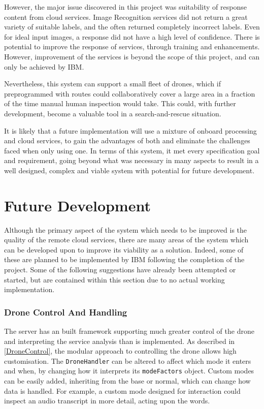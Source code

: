 \documentclass{article}
\begin{document}
However, the major issue discovered in this project was suitability of response content from cloud services. Image Recognition services did not return a great variety of suitable labels, and the often returned completely incorrect labels. Even for ideal input images, a response did not have a high level of confidence. There is potential to improve the response of services, through training and enhancements. However, improvement of the services is beyond the scope of this project, and can only be achieved by IBM. 

Nevertheless, this system can support a small fleet of drones, which if preprogrammed with routes could collaboratively cover a large area in a fraction of the time manual human inspection would take. This could, with further development, become a valuable tool in a search-and-rescue situation. 

It is likely that a future implementation will use a mixture of onboard processing and cloud services, to gain the advantages of both and eliminate the challenges faced when only using one. In terms of this system, it met every specification goal and requirement, going beyond what was necessary in many aspects to result in a well designed, complex and viable system with potential for future development.

\section{Future Development}
Although the primary aspect of the system which needs to be improved is the quality of the remote cloud services, there are many areas of the system which can be developed upon to improve its viability as a solution. Indeed, some of these are planned to be implemented by IBM following the completion of the project. Some of the following suggestions have already been attempted or started, but are contained within this section due to no actual working implementation.

\subsubsection{Drone Control And Handling}
The server has an built framework supporting much greater control of the drone and interpreting the service analysis than is implemented. As described in \ref{DroneControl}, the modular approach to controlling the drone allows high customisation. The \texttt{DroneHandler} can be altered to affect which mode it enters and when, by changing how it interprets its \texttt{modeFactors} object. Custom modes can be easily added, inheriting from the base or normal, which can change how data is handled. For example, a custom mode designed for interaction could inspect an audio transcript in more detail, acting upon the words. 
\end{document}
